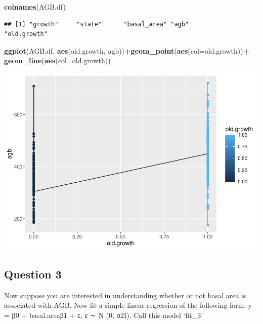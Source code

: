 \documentclass[
]{article}
\newenvironment{Shaded}{\begin{snugshade}}{\end{snugshade}}
\newcommand{\AttributeTok}[1]{\textcolor[rgb]{0.13,0.29,0.53}{#1}}
\newcommand{\FunctionTok}[1]{\textcolor[rgb]{0.13,0.29,0.53}{\textbf{#1}}}
\newcommand{\NormalTok}[1]{#1}
\newcommand{\SpecialCharTok}[1]{\textcolor[rgb]{0.81,0.36,0.00}{\textbf{#1}}}
\begin{document}
\begin{Shaded}
\begin{Highlighting}[]
\FunctionTok{colnames}\NormalTok{(AGB.df)}
\end{Highlighting}
\end{Shaded}

\begin{verbatim}
## [1] "growth"     "state"      "basal_area" "agb"        "old.growth"
\end{verbatim}

\begin{Shaded}
\begin{Highlighting}[]
\FunctionTok{ggplot}\NormalTok{(AGB.df, }\FunctionTok{aes}\NormalTok{(old.growth, agb))}\SpecialCharTok{+}\FunctionTok{geom\_point}\NormalTok{(}\FunctionTok{aes}\NormalTok{(}\AttributeTok{col=}\NormalTok{old.growth))}\SpecialCharTok{+} \FunctionTok{geom\_line}\NormalTok{(}\FunctionTok{aes}\NormalTok{(}\AttributeTok{col=}\NormalTok{old.growth))}
\end{Highlighting}
\end{Shaded}

\includegraphics{Stats-Lab-7_files/figure-latex/unnamed-chunk-4-1.pdf}

\hypertarget{question-3}{%
\subsection{Question 3}\label{question-3}}

Now suppose you are interested in understanding whether or not basal
area is associated with AGB. Now fit a simple linear regression of the
following form: y = β0 + basal.areaβ1 + ε, ε ∼ N (0, σ2I). Call this
model `fit\_3'
\end{document}
